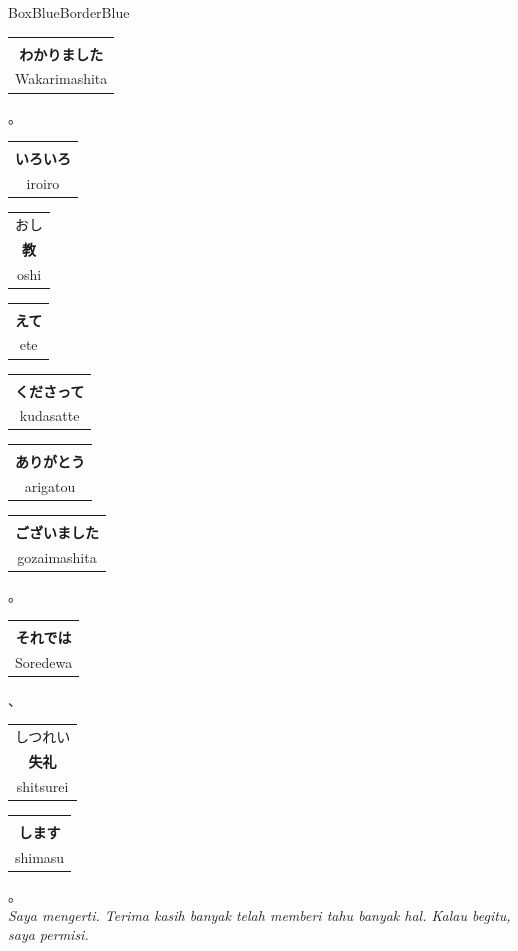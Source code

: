 ﻿\documentclass[12pt, a4paper]{article}
\makeatletter
\newcommand{\jpword}[3]{%
    \begin{tabular}{@{}c@{}}
        {\fontsize{9}{9}\selectfont \color{FuriganaColor} #2} \\[-0.2ex] %
        {\fontsize{22}{22}\selectfont \bfseries #1} \\[-0.4ex]            %
        {\fontsize{11}{11}\selectfont \color{RomajiColor} #3}           %
    \end{tabular}\hspace{0.2em}
}
\newcommand{\jpkana}[2]{%
    \begin{tabular}{@{}c@{}}
        \phantom{\fontsize{9}{9}\selectfont x} \\[-0.2ex]
        {\fontsize{22}{22}\selectfont \bfseries #1} \\[-0.4ex]
        {\fontsize{11}{11}\selectfont \color{RomajiColor} #2}
    \end{tabular}\hspace{0.2em}
}
\makeatother
\begin{document}
\begin{conversationbox}{BoxBlue}{BorderBlue}
    \jpkana{わかりました}{Wakarimashita}。
    \jpkana{いろいろ}{iroiro} \jpword{教}{おし}{oshi} \jpkana{えて}{ete} \jpkana{くださって}{kudasatte} \jpword{ありがとう}{}{arigatou} \jpkana{ございました}{gozaimashita}。
    \jpkana{それでは}{Soredewa}、\jpword{失礼}{しつれい}{shitsurei} \jpkana{します}{shimasu}。 \\
    \textit{\color{black!70} Saya mengerti. Terima kasih banyak telah memberi tahu banyak hal. Kalau begitu, saya permisi.}
\end{conversationbox}
\end{document}
